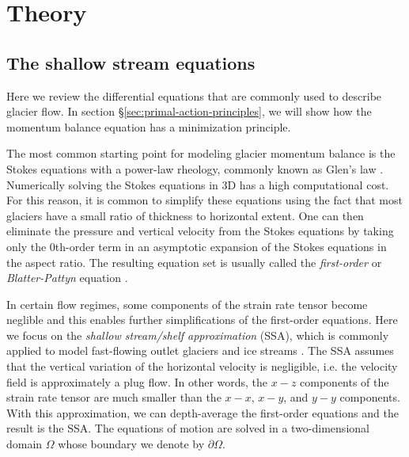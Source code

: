 \documentclass{article}
\theoremstyle{definition}
\theoremstyle{plain}
\begin{document}
\section{Theory}

\subsection{The shallow stream equations}

Here we review the differential equations that are commonly used to describe glacier flow.
In section \S\ref{sec:primal-action-principles}, we will show how the momentum balance equation has a minimization principle.

The most common starting point for modeling glacier momentum balance is the Stokes equations with a power-law rheology, commonly known as Glen's law \citep{glen1958law, greve2009dynamics}.
Numerically solving the Stokes equations in 3D has a high computational cost.
For this reason, it is common to simplify these equations using the fact that most glaciers have a small ratio of thickness to horizontal extent.
One can then eliminate the pressure and vertical velocity from the Stokes equations by taking only the 0th-order term in an asymptotic expansion of the Stokes equations in the aspect ratio.
The resulting equation set is usually called the \emph{first-order} or \emph{Blatter-Pattyn} equation \citep{greve2009dynamics}.

In certain flow regimes, some components of the strain rate tensor become neglible and this enables further simplifications of the first-order equations.
Here we focus on the \emph{shallow stream/shelf approximation} (SSA), which is commonly applied to model fast-flowing outlet glaciers and ice streams \citep{greve2009dynamics}.
The SSA assumes that the vertical variation of the horizontal velocity is negligible, i.e. the velocity field is approximately a plug flow.
In other words, the $x-z$ components of the strain rate tensor are much smaller than the $x-x$, $x-y$, and $y-y$ components.
With this approximation, we can depth-average the first-order equations and the result is the SSA.
The equations of motion are solved in a two-dimensional domain $\Omega$ whose boundary we denote by $\partial\Omega$.
\end{document}
